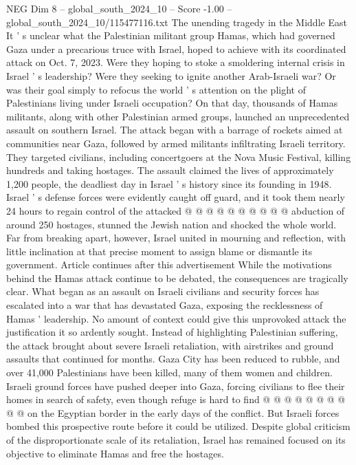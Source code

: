 \begin{textsample}{NEG Dim 8 – global\_south\_2024\_10 – Score -1.00 – global\_south\_2024\_10/115477116.txt}  \label{ex:f8_neg_138}
The unending tragedy in the Middle East It ' s unclear what the Palestinian militant group Hamas, which had governed Gaza under a precarious truce with Israel, hoped to achieve with its coordinated attack on Oct. 7, 2023.
Were they hoping to stoke a smoldering internal crisis in Israel ' s leadership?
Were they seeking to ignite another Arab-Israeli war?
Or was their goal simply to refocus the world ' s attention on the plight of Palestinians living under Israeli occupation?
On that day, thousands of Hamas militants, along with other Palestinian armed groups, launched an unprecedented assault on southern Israel.
The attack began with a barrage of rockets aimed at communities near Gaza, followed by armed militants infiltrating Israeli territory.
They targeted civilians, including concertgoers at the Nova Music Festival, killing hundreds and taking hostages.
The assault claimed the lives of approximately 1,200 people, the deadliest day in Israel ' s history since its founding in 1948.
Israel ' s defense forces were evidently caught off guard, and it took them nearly 24 hours to regain control of the attacked @ @ @ @ @ @ @ @ @ @ abduction of around 250 hostages, stunned the Jewish nation and shocked the whole world.
Far from breaking apart, however, Israel united in mourning and reflection, with little inclination at that precise moment to assign blame or dismantle its government.
Article continues after this advertisement While the motivations behind the Hamas attack continue to be debated, the consequences are tragically clear.
What began as an assault on Israeli civilians and security forces has escalated into a war that has devastated Gaza, exposing the recklessness of Hamas ' leadership.
No amount of context could give this unprovoked attack the justification it so ardently sought.
Instead of highlighting Palestinian suffering, the attack brought about severe Israeli retaliation, with airstrikes and ground assaults that continued for months.
Gaza City has been reduced to rubble, and over 41,000 Palestinians have been killed, many of them women and children.
Israeli ground forces have pushed deeper into Gaza, forcing civilians to flee their homes in search of safety, even though refuge is hard to find @ @ @ @ @ @ @ @ @ @ on the Egyptian border in the early days of the conflict.
But Israeli forces bombed this prospective route before it could be utilized.
Despite global criticism of the disproportionate scale of its retaliation, Israel has remained focused on its objective to eliminate Hamas and free the hostages.

\end{textsample}
